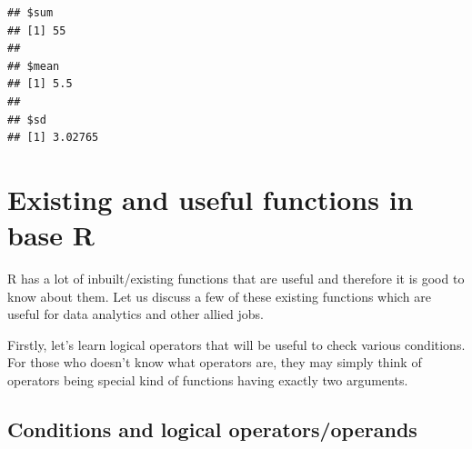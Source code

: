\documentclass[
]{book}
\begin{document}
\begin{verbatim}
## $sum
## [1] 55
## 
## $mean
## [1] 5.5
## 
## $sd
## [1] 3.02765
\end{verbatim}

\hypertarget{existing-and-useful-functions-in-base-r}{%
\section{Existing and useful functions in base R}\label{existing-and-useful-functions-in-base-r}}

R has a lot of inbuilt/existing functions that are useful and therefore it is good to know about them. Let us discuss a few of these existing functions which are useful for data analytics and other allied jobs.

Firstly, let's learn logical operators that will be useful to check various conditions. For those who doesn't know what operators are, they may simply think of operators being special kind of functions having exactly two arguments.

\hypertarget{conditions-and-logical-operatorsoperands}{%
\subsection{Conditions and logical operators/operands}\label{conditions-and-logical-operatorsoperands}}
\end{document}
